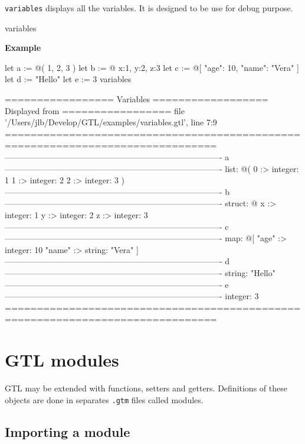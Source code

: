 \documentclass[10pt,openright,twosides,final]{memoir}
\newcommand{\gtlinline}[1]{\colorbox{light-blue}{\lstinline[language=gtl]{#1}}}
\newcommand{\example}{\vspace{.75em}\noindent\textbf{Example}\vspace{0em}}
\begin{document}
\gtlinline{variables} displays all the variables. It is designed to be use for debug purpose.

\begin{gtl}
variables
\end{gtl}

\example
\begin{gtl}
let a := @( 1, 2, 3 )
let b := @{ x:1, y:2, z:3 }
let c := @[ "age": 10, "name": "Vera" ]
let d := "Hello"
let e := 3
variables
\end{gtl}
\begin{console}
================= Variables ================== Displayed from =================
file '/Users/jlb/Develop/GTL/examples/variables.gtl', line 7:9
===============================================================================
-------------------------------------------------------------------------------
a
-------------------------------------------------------------------------------
list: @(
    0 :>
        integer: 1
    1 :>
        integer: 2
    2 :>
        integer: 3
)
-------------------------------------------------------------------------------
b
-------------------------------------------------------------------------------
struct: @{
    x :>
        integer: 1
    y :>
        integer: 2
    z :>
        integer: 3
}
-------------------------------------------------------------------------------
c
-------------------------------------------------------------------------------
map: @[
    "age" :>
        integer: 10
    "name" :>
        string: "Vera"
]
-------------------------------------------------------------------------------
d
-------------------------------------------------------------------------------
string: "Hello"
-------------------------------------------------------------------------------
e
-------------------------------------------------------------------------------
integer: 3
===============================================================================
\end{console}

\chapter{GTL modules}
\label{chap:modules}

GTL may be extended with functions, setters and getters. Definitions of these objects are done in  separates \texttt{\footnotesize .gtm} files called modules.

\section{Importing a module}
\end{document}
